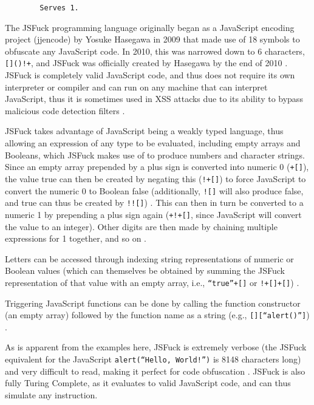\documentclass{article}
\begin{document}
\begin{enumerate}
\begin{verbatim}
        Serves 1.

    \end{verbatim}
    
    The JSFuck programming language originally began as a JavaScript encoding project (jjencode) by Yosuke Hasegawa in 2009 that made use of 18 symbols to obfuscate any JavaScript code. In 2010, this was narrowed down to 6 characters, \verb|[]()!+|, and JSFuck was officially created by Hasegawa by the end of 2010 \cite{WikimediaFoundation_2023b}. JSFuck is completely valid JavaScript code, and thus does not require its own interpreter or compiler and can run on any machine that can interpret JavaScript, thus it is sometimes used in XSS attacks due to its ability to bypass malicious code detection filters \cite{WikimediaFoundation_2023b}.
    
    JSFuck takes advantage of JavaScript being a weakly typed language, thus allowing an expression of any type to be evaluated, including empty arrays and Booleans, which JSFuck makes use of to produce numbers and character strings. Since an empty array prepended by a plus sign is converted into numeric 0 (\verb|+[]|), the value true can then be created by negating this (\verb|!+[]|) to force JavaScript to convert the numeric 0 to Boolean false (additionally, \verb|![]| will also produce false, and true can thus be created by \verb|!![]|) \cite{WikimediaFoundation_2023b}. This can then in turn be converted to a numeric 1 by prepending a plus sign again (\verb|+!+[]|, since JavaScript will convert the value to an integer). Other digits are then made by chaining multiple expressions for 1 together, and so on \cite{WikimediaFoundation_2023b}.
    
    Letters can be accessed through indexing string representations of numeric or Boolean values (which can themselves be obtained by summing the JSFuck representation of that value with an empty array, i.e., \verb|“true”+[]| or \verb|!+[]+[]|) \cite{WikimediaFoundation_2023b}.
    
    Triggering JavaScript functions can be done by calling the function constructor (an empty array) followed by the function name as a string (e.g., \verb|[][“alert()”]|) \cite{WikimediaFoundation_2023b}. 
    
    As is apparent from the examples here, JSFuck is extremely verbose (the JSFuck equivalent for the JavaScript \verb|alert(“Hello, World!”)| is 8148 characters long) and very difficult to read, making it perfect for code obfuscation \cite{Hasegawa_2012}\cite{WikimediaFoundation_2023b}. JSFuck is also fully Turing Complete, as it evaluates to valid JavaScript code, and can thus simulate any instruction. \\


\end{enumerate}
\end{document}
